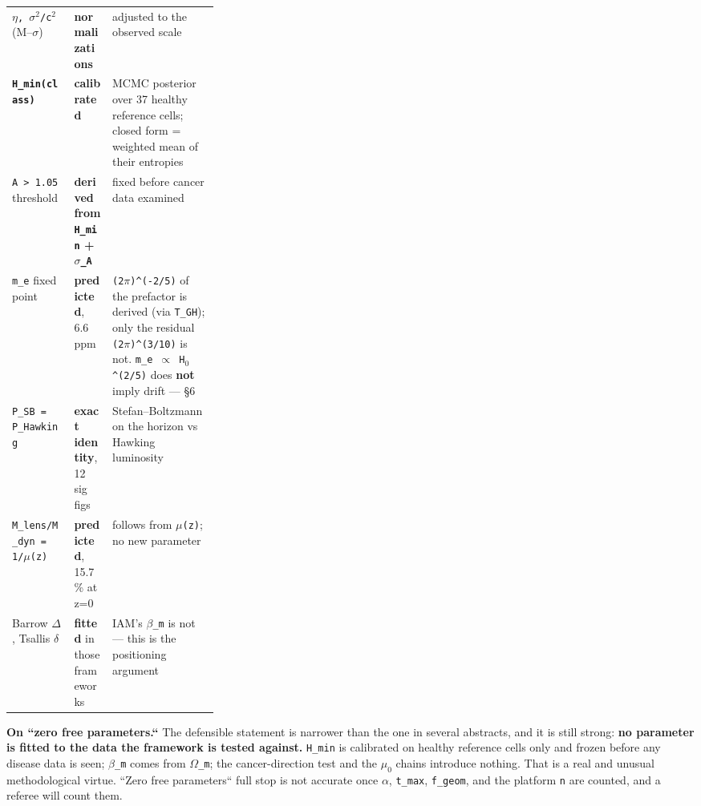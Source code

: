 \documentclass[12pt,a4paper]{article}
\begin{document}
\begin{small}
\begin{tabularx}{\linewidth}{L{0.30\linewidth}YY}
\texttt{$\eta$, $\sigma^{2}$/\allowbreak{}c$^{2}$} (M--$\sigma$) & \textbf{normalizations} & adjusted to the observed scale \\
\textbf{\texttt{H\_\allowbreak{}min(class)}} & \textbf{calibrated} & MCMC posterior over 37 healthy reference cells; closed form = weighted mean of their entropies \\
\texttt{A > 1.05} threshold & \textbf{derived from \texttt{H\_\allowbreak{}min} + \texttt{$\sigma$\_\allowbreak{}A}} & fixed before cancer data examined \\
\texttt{m\_\allowbreak{}e} fixed point & \textbf{predicted}, 6.6 ppm & \texttt{(2$\pi$)\textasciicircum{}(-2/\allowbreak{}5)} of the prefactor is derived (via \texttt{T\_\allowbreak{}GH}); only the residual \texttt{(2$\pi$)\textasciicircum{}(3/\allowbreak{}10)} is not. \texttt{m\_\allowbreak{}e $\propto$ H$_{0}$\textasciicircum{}(2/\allowbreak{}5)} does \textbf{not} imply drift --- \S6 \\
\texttt{P\_\allowbreak{}SB = P\_\allowbreak{}Hawking} & \textbf{exact identity}, 12 sig figs & Stefan--Boltzmann on the horizon vs Hawking luminosity \\
\texttt{M\_\allowbreak{}lens/\allowbreak{}M\_\allowbreak{}dyn = 1/\allowbreak{}$\mu$(z)} & \textbf{predicted}, 15.7\% at z=0 & follows from \texttt{$\mu$(z)}; no new parameter \\
Barrow \texttt{$\Delta$}, Tsallis \texttt{$\delta$} & \textbf{fitted} in those frameworks & IAM's \texttt{$\beta$\_\allowbreak{}m} is not --- this is the positioning argument \\
\bottomrule
\end{tabularx}
\end{small}


\textbf{On ``zero free parameters.``} The defensible statement is narrower than the one in several abstracts, and it is still strong: \textbf{no parameter is fitted to the data the framework is tested against.} \texttt{H\_min} is calibrated on healthy reference cells only and frozen before any disease data is seen; \texttt{$\beta$\_m} comes from \texttt{$\Omega$\_m}; the cancer-direction test and the $\mu_{0}$ chains introduce nothing. That is a real and unusual methodological virtue. ``Zero free parameters`` full stop is not accurate once \texttt{$\alpha$}, \texttt{t\_max}, \texttt{f\_geom}, and the platform \texttt{n} are counted, and a referee will count them.
\end{document}
